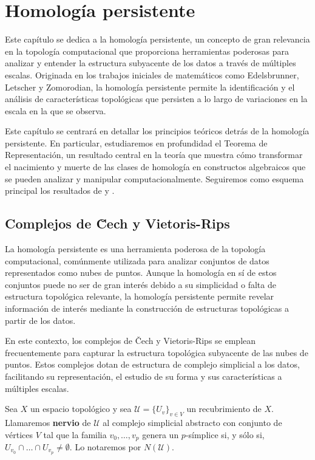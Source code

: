 
\chapter{Homología persistente}

Este capítulo se dedica a la homología persistente, un concepto de gran relevancia en la topología computacional que proporciona herramientas poderosas para analizar y entender la estructura subyacente de los datos a través de múltiples escalas. Originada en los trabajos iniciales de matemáticos como Edelsbrunner, Letscher y Zomorodian, la homología persistente permite la identificación y el análisis de características topológicas que persisten a lo largo de variaciones en la escala en la que se observa.

Este capítulo se centrará en detallar los principios teóricos detrás de la homología persistente. En particular, estudiaremos en profundidad el Teorema de Representación, un resultado central en la teoría que muestra cómo transformar el nacimiento y muerte de las clases de homología en constructos algebraicos que se pueden analizar y manipular computacionalmente. Seguiremos como esquema principal los resultados de \cite{zomorodian2004computing} y \cite{dey2022computational}.

\section{Complejos de \u Cech y Vietoris-Rips}

La homología persistente es una herramienta poderosa de la topología computacional, comúnmente utilizada para analizar conjuntos de datos representados como nubes de puntos. Aunque la homología en sí de estos conjuntos puede no ser de gran interés debido a su simplicidad o falta de estructura topológica relevante, la homología persistente permite revelar información de interés mediante la construcción de estructuras topológicas a partir de los datos.

En este contexto, los complejos de Čech y Vietoris-Rips se emplean frecuentemente para capturar la estructura topológica subyacente de las nubes de puntos. Estos complejos dotan de estructura de complejo simplicial a los datos, facilitando su representación, el estudio de su forma y sus características a múltiples escalas.

\begin{definicion}
	Sea \(X\) un espacio topológico y sea \(\mathcal{U} = \{U_v\}_{v \in V}\) un recubrimiento de \(X\). Llamaremos \textbf{nervio} de \(\mathcal{U}\) al complejo simplicial abstracto con conjunto de vértices \(V\) tal que la familia \(v_0, \dots, v_p\) genera un \(p\)-símplice si, y sólo si, \(U_{v_0} \cap \dots \cap U_{v_p} \neq \emptyset\). Lo notaremos por \(N(\mathcal{U})\).
\end{definicion}

